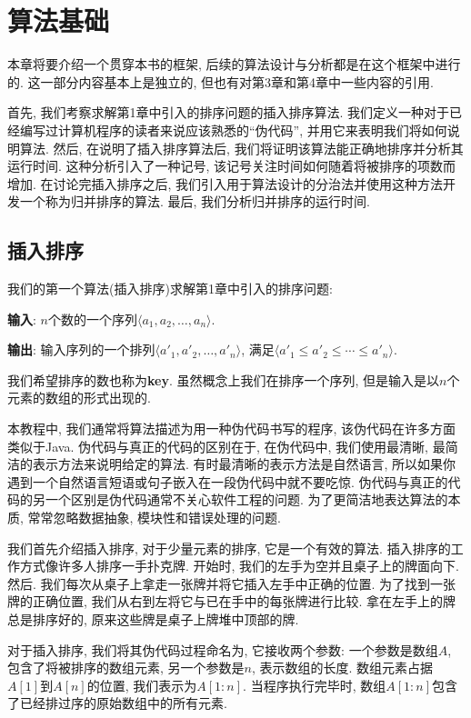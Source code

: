\documentclass[oneside,10pt,fontset=none]{ctexbook}
\numberwithin{definition}{chapter}
\numberwithin{theorem}{chapter}
\numberwithin{proof}{chapter}
\begin{document}
\chapter{算法基础}

本章将要介绍一个贯穿本书的框架, 后续的算法设计与分析都是在这个框架中进行的. 这一部分内容基本上是独立的, 但也有对第3章和第4章中一些内容的引用.

首先, 我们考察求解第1章中引入的排序问题的插入排序算法. 我们定义一种对于已经编写过计算机程序的读者来说应该熟悉的``伪代码'', 并用它来表明我们将如何说明算法. 然后, 在说明了插入排序算法后, 我们将证明该算法能正确地排序并分析其运行时间. 这种分析引入了一种记号, 该记号关注时间如何随着将被排序的项数而增加. 在讨论完插入排序之后, 我们引入用于算法设计的分治法并使用这种方法开发一个称为归并排序的算法. 最后, 我们分析归并排序的运行时间.

\section{插入排序}

我们的第一个算法(插入排序)求解第1章中引入的排序问题:

\textbf{输入}: $n$个数的一个序列$\langle a_1, a_2, \dots, a_n\rangle$.

\textbf{输出}: 输入序列的一个排列$\langle a'_1, a'_2, \dots, a'_n\rangle$, 满足$\langle a'_1\leq a'_2\leq\cdots\leq a'_n\rangle$.

我们希望排序的数也称为\textbf{key}. 虽然概念上我们在排序一个序列, 但是输入是以$n$个元素的数组的形式出现的.

本教程中, 我们通常将算法描述为用一种伪代码书写的程序, 该伪代码在许多方面类似于Java. 伪代码与真正的代码的区别在于, 在伪代码中, 我们使用最清晰, 最简洁的表示方法来说明给定的算法. 有时最清晰的表示方法是自然语言, 所以如果你遇到一个自然语言短语或句子嵌入在一段伪代码中就不要吃惊. 伪代码与真正的代码的另一个区别是伪代码通常不关心软件工程的问题. 为了更简洁地表达算法的本质, 常常忽略数据抽象, 模块性和错误处理的问题.

我们首先介绍插入排序, 对于少量元素的排序, 它是一个有效的算法. 插入排序的工作方式像许多人排序一手扑克牌. 开始时, 我们的左手为空并且桌子上的牌面向下. 然后. 我们每次从桌子上拿走一张牌并将它插入左手中正确的位置. 为了找到一张牌的正确位置, 我们从右到左将它与已在手中的每张牌进行比较. 拿在左手上的牌总是排序好的, 原来这些牌是桌子上牌堆中顶部的牌.

对于插入排序, 我们将其伪代码过程命名为, 它接收两个参数: 一个参数是数组$A$, 包含了将被排序的数组元素, 另一个参数是$n$, 表示数组的长度. 数组元素占据$A[1]$到$A[n]$的位置, 我们表示为$A[1:n]$. 当程序执行完毕时, 数组$A[1:n]$包含了已经排过序的原始数组中的所有元素.
\end{document}
